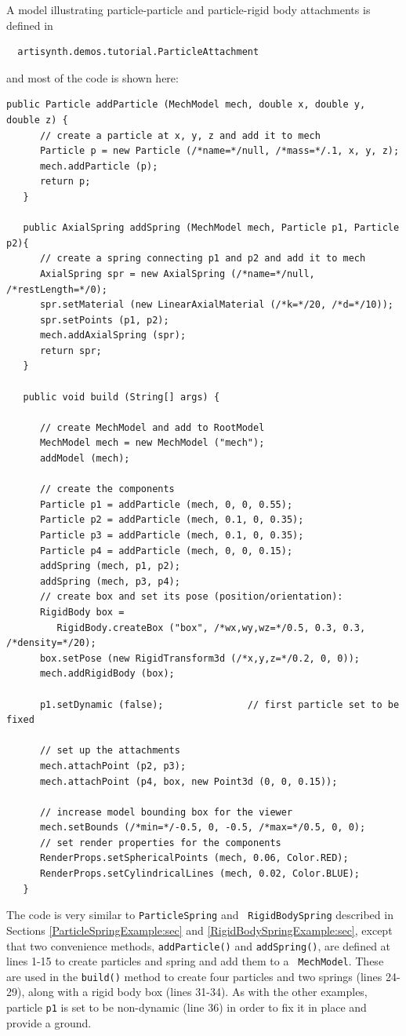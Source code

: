 A model illustrating particle-particle and particle-rigid body attachments
is defined in
%
\begin{verbatim}
  artisynth.demos.tutorial.ParticleAttachment
\end{verbatim}
%
and most of the code is shown here:
%
\lstset{numbers=left}
\begin{lstlisting}[]
   public Particle addParticle (MechModel mech, double x, double y, double z) {
      // create a particle at x, y, z and add it to mech
      Particle p = new Particle (/*name=*/null, /*mass=*/.1, x, y, z);
      mech.addParticle (p);
      return p;
   }

   public AxialSpring addSpring (MechModel mech, Particle p1, Particle p2){
      // create a spring connecting p1 and p2 and add it to mech
      AxialSpring spr = new AxialSpring (/*name=*/null, /*restLength=*/0);
      spr.setMaterial (new LinearAxialMaterial (/*k=*/20, /*d=*/10));
      spr.setPoints (p1, p2);
      mech.addAxialSpring (spr);
      return spr;
   }

   public void build (String[] args) {

      // create MechModel and add to RootModel
      MechModel mech = new MechModel ("mech");
      addModel (mech);

      // create the components
      Particle p1 = addParticle (mech, 0, 0, 0.55);
      Particle p2 = addParticle (mech, 0.1, 0, 0.35);
      Particle p3 = addParticle (mech, 0.1, 0, 0.35);
      Particle p4 = addParticle (mech, 0, 0, 0.15);
      addSpring (mech, p1, p2);
      addSpring (mech, p3, p4);
      // create box and set its pose (position/orientation):
      RigidBody box =
         RigidBody.createBox ("box", /*wx,wy,wz=*/0.5, 0.3, 0.3, /*density=*/20);
      box.setPose (new RigidTransform3d (/*x,y,z=*/0.2, 0, 0));
      mech.addRigidBody (box);

      p1.setDynamic (false);               // first particle set to be fixed

      // set up the attachments
      mech.attachPoint (p2, p3);
      mech.attachPoint (p4, box, new Point3d (0, 0, 0.15));

      // increase model bounding box for the viewer
      mech.setBounds (/*min=*/-0.5, 0, -0.5, /*max=*/0.5, 0, 0);  
      // set render properties for the components
      RenderProps.setSphericalPoints (mech, 0.06, Color.RED);
      RenderProps.setCylindricalLines (mech, 0.02, Color.BLUE);
   }
\end{lstlisting}
\lstset{numbers=none}
%
The code is very similar to {\tt ParticleSpring} and {\tt
RigidBodySpring} described in Sections \ref{ParticleSpringExample:sec}
and \ref{RigidBodySpringExample:sec}, except that two convenience
methods, {\tt addParticle()} and {\tt addSpring()}, are defined at
lines 1-15 to create particles and spring and add them to a {\tt
MechModel}. These are used in the {\tt build()} method to create four
particles and two springs (lines 24-29), along with a rigid body box
(lines 31-34). As with the other examples, particle {\tt p1} is set to
be non-dynamic (line 36) in order to fix it in place and provide a
ground.

